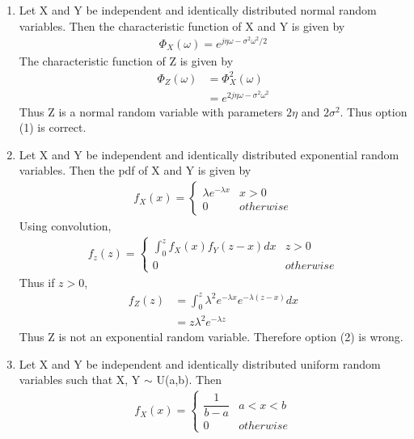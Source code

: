 \documentclass[journal,12pt,twocolumn]{IEEEtran}
\begin{document}
\begin{enumerate}[label = \arabic*)]
    \item Let X and Y be independent and identically distributed normal random variables. Then the characteristic function of X and Y is given by
    \begin{align}
        \Phi_X(\omega) = e^{j\eta\omega - \sigma^2\omega^2/2}
    \end{align}
    The characteristic function of Z is given by
    \begin{align}
        \Phi_Z(\omega) &= \Phi_X^2(\omega)\\
                       &= e^{2j\eta\omega - \sigma^2\omega^2}
    \end{align}
    Thus Z is a normal random variable with parameters $2\eta$ and $2\sigma^2$. Thus option (1) is correct.
    \item Let X and Y be independent and identically distributed exponential random variables. Then the pdf of X and Y is given by
    \begin{align}
        f_X(x) = 
        \begin{cases}
            \lambda e^{-\lambda x} &x>0\\
            0 &otherwise
        \end{cases}
    \end{align}
    Using convolution, 
    \begin{align}
        f_z(z) = 
        \begin{cases}
            \int_0^z f_X(x)f_Y(z-x) dx &z>0\\
            0 &otherwise
        \end{cases}
    \end{align}
    Thus if $z>0$,
    \begin{align}
        f_Z(z) &= \int_0^z \lambda^2 e^{-\lambda x}e^{-\lambda(z-x)} dx\\
               &= z \lambda^2 e^{-\lambda z}
    \end{align}
    Thus Z is not an exponential random variable. Therefore option (2) is wrong.
    \item Let X and Y be independent and identically distributed uniform random variables such that X, Y $\sim$ U(a,b). Then
    \begin{align}
        f_X(x) = 
        \begin{cases}
            \dfrac{1}{b-a} &a<x<b\\
            0 &otherwise
        \end{cases}

\end{align}
\end{enumerate}
\end{document}

